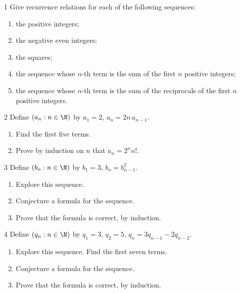 
\begin{exercise}{1}
    Give recurrence relations for each of the following sequences:
    \begin{enumerate}[label=(\alph*)]
        \item the positive integers;
        \item the negative even integers;
        \item the squares;
        \item the sequence whose $n$-th term is the sum of the first $n$
              positive integers;
        \item the sequence whose $n$-th term is the sum of the reciprocals of the
              first $n$ positive integers.
    \end{enumerate}
\end{exercise}

\begin{exercise}{2}
    Define $(a_n:n\in\N)$ by $a_1=2$, $a_n=2n\,a_{n-1}$.
    \begin{enumerate}[label=(\alph*)]
        \item Find the first five terms.
        \item Prove by induction on $n$ that $a_n=2^n n!$.
    \end{enumerate}
\end{exercise}

\begin{exercise}{3}
    Define $(b_n:n\in\N)$ by $b_1=3$, $b_n=b_{n-1}^2$.
    \begin{enumerate}[label=(\alph*)]
        \item Explore this sequence.
        \item Conjecture a formula for the sequence.
        \item Prove that the formula is correct, by induction.
    \end{enumerate}
\end{exercise}

\begin{exercise}{4}
    Define $(q_n:n\in\N)$ by $q_1=3$, $q_2=5$, $q_n=3q_{n-1}-2q_{n-2}$.
    \begin{enumerate}[label=(\alph*)]
        \item Explore this sequence. Find the first seven terms.
        \item Conjecture a formula for the sequence.
        \item Prove that the formula is correct, by induction.
    \end{enumerate}
\end{exercise}

